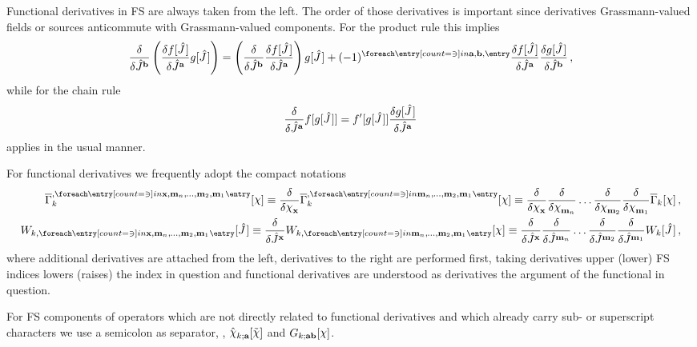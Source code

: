 Functional derivatives in FS are always taken from the left.
The  order of those derivatives is important since derivatives \wrt{} Grassmann-valued fields or sources anticommute with Grassmann-valued components.
For the product rule this implies
\begin{align}
	\frac{\delta}{\delta \FSfu{J}{b}} \del{ \frac{\delta f[\FSf{J}\mkern1.5mu]}{\delta \FSfu{J}{a}} g[\FSf{J}\mkern1.5mu] } =
		\del{\frac{\delta}{\delta \FSfu{J}{b}}\frac{\delta f[\FSf{J}\mkern1.5mu]}{\delta \FSfu{J}{a}}} g[\FSf{J}\mkern1.5mu]
		+\FSc{\FSidx{a},\FSidx{b}}\frac{\delta f[\FSf{J}\mkern1.5mu]}{\delta \FSfu{J}{a}} \frac{\delta g[\FSf{J}\mkern1.5mu]}{\delta \FSfu{J}{b}} \, , \label{eq:FSproductrule}
\end{align}
while for the chain rule
\begin{align}
	\frac{\delta}{\delta \hat{J}^{\textbf{a}}} f[g[\hat{J}\mkern1.5mu]] = f'[g[\hat{J}\mkern1.5mu]] \frac{\delta g[\hat{J}\mkern1.5mu]}{\delta \hat{J}^{\textbf{a}}} \label{eq:FSchainrule}
\end{align}
applies in the usual manner.

For functional derivatives we frequently adopt the compact notations
\begin{align}
	\FSeaa_k^{,\row{\FSidx{x},\FSidx{m}_n,\mkern-1mu\ldots,\FSidx{m}_2,\FSidx{m}_1}}[\FSmf{\FSsf}]%
		\equiv\frac{\delta}{\delta \FSmfd{\FSsf}{x}}\FSeaa_k^{,\row{\FSidx{m}_n,\mkern-1mu\ldots,\FSidx{m}_2,\FSidx{m}_1}}[\FSmf{\FSsf}]%
		\equiv\frac{\delta}{\delta \FSmfd{\FSsf}{x}} \frac{\delta}{\delta \FSmf{\FSsf}_{\FSidx{m}_n}}\ldots \frac{\delta}{\delta \FSmf{\FSsf}_{\FSidx{m}_2}} \frac{\delta}{\delta \FSmf{\FSsf}_{\FSidx{m}_1}} \FSeaa_k [\FSmf{\FSsf}] \, ,\\
	W_{k,\row{\FSidx{x},\FSidx{m}_n,\mkern-1mu\ldots,\FSidx{m}_2,\FSidx{m}_1}}[\FSf{J}\mkern1.5mu]%
		\equiv\frac{\delta}{\delta \FSfu{J}{x}}W_{k,\row{\FSidx{m}_n,\mkern-1mu\ldots,\FSidx{m}_2,\FSidx{m}_1}}[\FSmf{\FSsf}]%
		\equiv \frac{\delta}{\delta \FSfu{J}{x}} \frac{\delta}{\delta \FSf{J}^{\FSidx{m}_n}}\ldots \frac{\delta}{\delta \FSf{J}^{\FSidx{m}_2}} \frac{\delta}{\delta \FSf{J}^{\FSidx{m}_1}} W_k [\FSf{J}\mkern1.5mu] \, ,
\end{align}
where additional derivatives are attached from the left, derivatives to the right are performed first, taking derivatives \wrt{} upper (lower) FS indices lowers (raises) the index in question and functional derivatives are understood as derivatives \wrt{} the argument of the functional in question.

For FS components of operators which are not directly related to functional derivatives and which already carry sub- or superscript characters we use a semicolon as separator, \eg, $\FSf{\FSsf}_{k;\FSidx{a}}[\FSff{\FSsf}]$ and $G_{k;\FSidx{ab}}[\FSmf{\FSsf}]$.